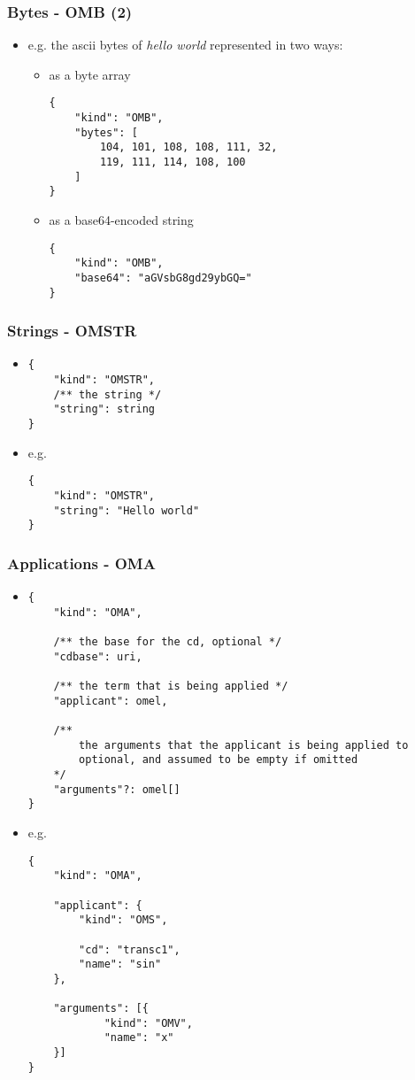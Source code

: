 \documentclass[usenames,dvipsnames]{beamer}
\begin{document}
\begin{frame}[fragile]
    \frametitle{Bytes - OMB (2)}
    \begin{itemize}
    \item e.g. the ascii bytes of \textit{hello world} represented in two ways:
    \begin{itemize}
            \item as a byte array
\begin{lstlisting}
{
    "kind": "OMB",
    "bytes": [
        104, 101, 108, 108, 111, 32, 
        119, 111, 114, 108, 100
    ]
}
\end{lstlisting}
            \item as a base64-encoded string
\begin{lstlisting}
{
    "kind": "OMB",
    "base64": "aGVsbG8gd29ybGQ="
}
\end{lstlisting}
        \end{itemize}
    \end{itemize}
\end{frame}

\begin{frame}[fragile]
    \frametitle{Strings - OMSTR}
    \begin{itemize}
        \item
        \begin{lstlisting}
{
    "kind": "OMSTR", 
    /** the string */
    "string": string
}
    \end{lstlisting}
        \item e.g. \begin{lstlisting}
{
    "kind": "OMSTR", 
    "string": "Hello world"
}
\end{lstlisting}
    \end{itemize}
\end{frame}

\begin{frame}[fragile]
    \frametitle{Applications - OMA}
    \begin{itemize}
        \item
\begin{lstlisting}
{
    "kind": "OMA", 

    /** the base for the cd, optional */
    "cdbase": uri, 

    /** the term that is being applied */
    "applicant": omel, 

    /**
        the arguments that the applicant is being applied to 
        optional, and assumed to be empty if omitted
    */
    "arguments"?: omel[]
}
    \end{lstlisting}
        \item e.g. \begin{lstlisting}
{
    "kind": "OMA",

    "applicant": {
        "kind": "OMS",

        "cd": "transc1",
        "name": "sin"
    },

    "arguments": [{
            "kind": "OMV",
            "name": "x"
    }]
}
\end{lstlisting}
    \end{itemize}
\end{frame}
\end{document}
